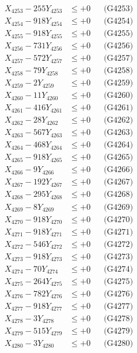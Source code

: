 \documentclass[a4paper,10pt]{article}
\begin{document}
{\begin{align}
X_{4253} - 255Y_{4253} &\leq +0 && \text{(G4253)} \\
X_{4254} - 918Y_{4254} &\leq +0 && \text{(G4254)} \\
X_{4255} - 918Y_{4255} &\leq +0 && \text{(G4255)} \\
X_{4256} - 731Y_{4256} &\leq +0 && \text{(G4256)} \\
X_{4257} - 572Y_{4257} &\leq +0 && \text{(G4257)} \\
X_{4258} - 79Y_{4258} &\leq +0 && \text{(G4258)} \\
X_{4259} - 2Y_{4259} &\leq +0 && \text{(G4259)} \\
X_{4260} - 11Y_{4260} &\leq +0 && \text{(G4260)} \\
\allowbreak
X_{4261} - 416Y_{4261} &\leq +0 && \text{(G4261)} \\
X_{4262} - 28Y_{4262} &\leq +0 && \text{(G4262)} \\
X_{4263} - 567Y_{4263} &\leq +0 && \text{(G4263)} \\
X_{4264} - 468Y_{4264} &\leq +0 && \text{(G4264)} \\
X_{4265} - 918Y_{4265} &\leq +0 && \text{(G4265)} \\
X_{4266} - 9Y_{4266} &\leq +0 && \text{(G4266)} \\
X_{4267} - 192Y_{4267} &\leq +0 && \text{(G4267)} \\
X_{4268} - 295Y_{4268} &\leq +0 && \text{(G4268)} \\
X_{4269} - 8Y_{4269} &\leq +0 && \text{(G4269)} \\
X_{4270} - 918Y_{4270} &\leq +0 && \text{(G4270)} \\
\allowbreak
X_{4271} - 918Y_{4271} &\leq +0 && \text{(G4271)} \\
X_{4272} - 546Y_{4272} &\leq +0 && \text{(G4272)} \\
X_{4273} - 918Y_{4273} &\leq +0 && \text{(G4273)} \\
X_{4274} - 70Y_{4274} &\leq +0 && \text{(G4274)} \\
X_{4275} - 264Y_{4275} &\leq +0 && \text{(G4275)} \\
X_{4276} - 782Y_{4276} &\leq +0 && \text{(G4276)} \\
X_{4277} - 918Y_{4277} &\leq +0 && \text{(G4277)} \\
X_{4278} - 3Y_{4278} &\leq +0 && \text{(G4278)} \\
X_{4279} - 515Y_{4279} &\leq +0 && \text{(G4279)} \\
X_{4280} - 3Y_{4280} &\leq +0 && \text{(G4280)} \\

\end{align}}
\end{document}
